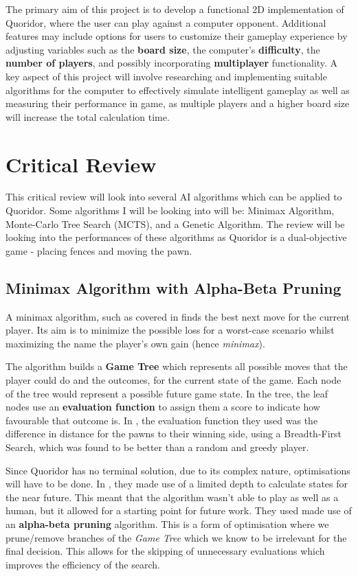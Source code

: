 \documentclass[review]{cmpreport}
\begin{document}
\noindent The primary aim of this project is to develop a functional 2D implementation of Quoridor, where the user can play against a computer opponent. Additional features may include options for users to customize their gameplay experience by adjusting variables such as the \textbf{board size}, the computer's \textbf{difficulty}, the \textbf{number of players}, and possibly incorporating \textbf{multiplayer} functionality. A key aspect of this project will involve researching and implementing suitable algorithms for the computer to effectively simulate intelligent gameplay as well as measuring their performance in game, as multiple players and a higher board size will increase the total calculation time.

\section{Critical Review}
This critical review will look into several AI algorithms which can be applied to Quoridor. Some algorithms I will be looking into will be: Minimax Algorithm, Monte-Carlo Tree Search (MCTS), and a Genetic Algorithm. The review will be looking into the performances of these algorithms as Quoridor is a dual-objective game - placing fences and moving the pawn.

\subsection{Minimax Algorithm with Alpha-Beta Pruning}
A minimax algorithm, such as covered in \cite{plaat1996best} finds the best next move for the current player. Its aim is to minimize the possible loss for a worst-case scenario whilst maximizing the name the player's own gain (hence \textit{minimax}).

\noindent The algorithm builds a \textbf{Game Tree} which represents all possible moves that the player could do and the outcomes, for the current state of the game. Each node of the tree would represent a possible future game state. In the tree, the leaf nodes use an \textbf{evaluation function} to assign them a score to indicate how favourable that outcome is. In \cite{josequoridor}, the evaluation function they used was the difference in distance for the pawns to their winning side, using a Breadth-First Search, which was found to be better than a random and greedy player.

\noindent Since Quoridor has no terminal solution, due to its complex nature, optimisations will have to be done. In \cite{josequoridor}, they made use of a limited depth to calculate states for the near future. This meant that the algorithm wasn't able to play as well as a human, but it allowed for a starting point for future work. They used made use of an \textbf{alpha-beta pruning} algorithm. This is a form of optimisation where we prune/remove branches of the \textit{Game Tree} which we know to be irrelevant for the final decision. This allows for the skipping of unnecessary evaluations which improves the efficiency of the search.
\end{document}
